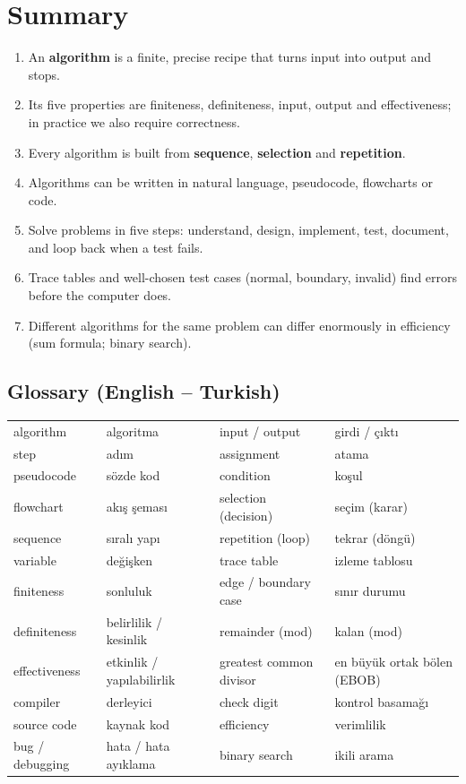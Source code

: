 \documentclass[11pt,a4paper]{article}
\newcommand{\term}[1]{\textbf{\color{ink}#1}}
\begin{document}
\section{Summary}\label{sec:summary}
\begin{enumerate}[leftmargin=*,itemsep=1pt]
  \item An \term{algorithm} is a finite, precise recipe that turns input into output and stops.
  \item Its five properties are finiteness, definiteness, input, output and effectiveness; in practice we also require correctness.
  \item Every algorithm is built from \textcolor{seqc}{\textbf{sequence}}, \textcolor{selc}{\textbf{selection}} and \textcolor{repc}{\textbf{repetition}}.
  \item Algorithms can be written in natural language, pseudocode, flowcharts or code.
  \item Solve problems in five steps: understand, design, implement, test, document, and loop back when a test fails.
  \item Trace tables and well-chosen test cases (normal, boundary, invalid) find errors before the computer does.
  \item Different algorithms for the same problem can differ enormously in efficiency (sum formula; binary search).
\end{enumerate}

\subsection*{Glossary (English -- Turkish)}
\begin{center}\small
\begin{tabular}{ll@{\hspace{10mm}}ll}
\toprule
algorithm & algoritma & input / output & girdi / çıktı\\
step & adım & assignment & atama\\
pseudocode & sözde kod & condition & koşul\\
flowchart & akış şeması & selection (decision) & seçim (karar)\\
sequence & sıralı yapı & repetition (loop) & tekrar (döngü)\\
variable & değişken & trace table & izleme tablosu\\
finiteness & sonluluk & edge / boundary case & sınır durumu\\
definiteness & belirlilik / kesinlik & remainder (mod) & kalan (mod)\\
effectiveness & etkinlik / yapılabilirlik & greatest common divisor & en büyük ortak bölen (EBOB)\\
compiler & derleyici & check digit & kontrol basamağı\\
source code & kaynak kod & efficiency & verimlilik\\
bug / debugging & hata / hata ayıklama & binary search & ikili arama\\ \bottomrule
\end{tabular}
\end{center}
\end{document}
